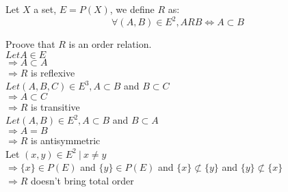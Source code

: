 \documentclass{article}
\begin{document}
\noindent Let $X$ a set, $E = P(X)$, we define $R$ as:\\
\[
\forall (A, B) \in E^2, ARB \iff A \subset B
\]

\noindent Proove that $R$ is an order relation.\\

\noindent $Let A \in E$\\
$\Rightarrow A \subset A$\\
$\Rightarrow R$ is reflexive\\

\noindent $Let (A, B, C) \in E^3, A \subset B $ and 
$B \subset C$\\
$\Rightarrow A \subset C$\\
$\Rightarrow R$ is transitive\\

\noindent $Let (A, B) \in E^2, A \subset B $ and
$B \subset A$\\
$\Rightarrow A = B$\\
$\Rightarrow R$ is antisymmetric\\

\noindent Let $(x, y) \in E^2 \ | \ x \neq y$\\
$\Rightarrow \{x\} \in P(E) $ and $ \{y\} \in P(E) $
and $ \{x\} \not\subset \{y\} $ and $ \{y\} \not\subset
\{x\}$\\
$\Rightarrow R $ doesn't bring total order
\end{document}
